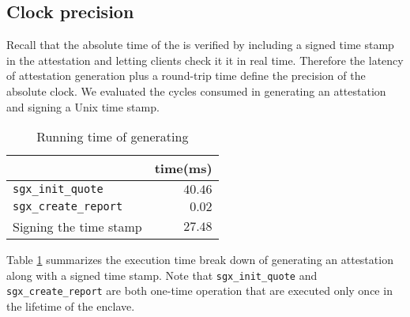 
\subsection{Clock precision}

Recall that the absolute time of the \encname is verified
by including a signed time stamp in the attestation and letting 
clients check it it in real time. Therefore the latency
of attestation generation plus a round-trip time
define the precision of the absolute clock. 
We evaluated the cycles consumed in generating an attestation and
signing a Unix time stamp.


\begin{table}[h]
\centering
\begin{tabular}{lr}
\toprule
  & time(ms) \\
\midrule
\texttt{sgx\_init\_quote} & $40.46$ \\
\texttt{sgx\_create\_report} & $0.02$ \\
Signing the time stamp & $27.48$ \\
\bottomrule
\end{tabular}
\caption{Running time of generating \att}
\label{tab:eval_att}
\end{table}

Table \ref{tab:eval_att} summarizes the execution time
break down of generating an attestation along with a 
signed time stamp. Note that \texttt{sgx\_init\_quote}
and \texttt{sgx\_create\_report} are both one-time
operation that are executed only once in the lifetime
of the enclave. 

